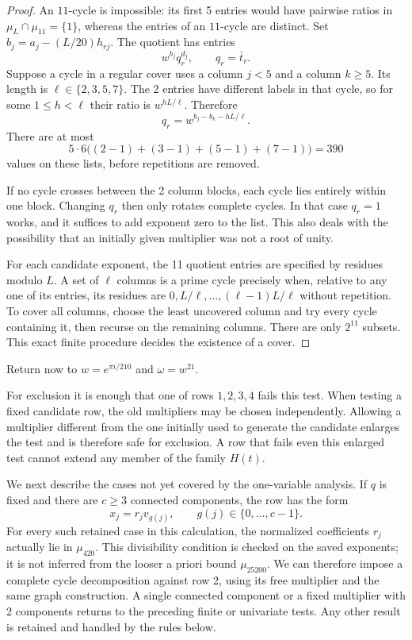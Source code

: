 \documentclass[11pt,a4paper]{article}
\theoremstyle{plain}
\theoremstyle{definition}
\theoremstyle{plain}
\begin{document}
\begin{proof}
An $11$-cycle is impossible: its first 5 entries would have pairwise ratios in $\mu_L\cap\mu_{11}=\{1\}$, whereas the entries of an $11$-cycle are distinct. Set $b_j=a_j-(L/20)h_{rj}$. The quotient has entries
$$w^{b_j}q_r^{d_j},\qquad q_r=\bar t_r.$$
Suppose a cycle in a regular cover uses a column $j<5$ and a column $k\geq5$. Its length is $\ell\in\{2,3,5,7\}$. The 2 entries have different labels in that cycle, so for some $1\leq h<\ell$ their ratio is $w^{hL/\ell}$. Therefore
$$q_r=w^{b_j-b_k-hL/\ell}.$$
There are at most
$$5\cdot6\bigl((2-1)+(3-1)+(5-1)+(7-1)\bigr)=390$$
values on these lists, before repetitions are removed.

If no cycle crosses between the 2 column blocks, each cycle lies entirely within one block. Changing $q_r$ then only rotates complete cycles. In that case $q_r=1$ works, and it suffices to add exponent zero to the list. This also deals with the possibility that an initially given multiplier was not a root of unity.

For each candidate exponent, the 11 quotient entries are specified by residues modulo $L$. A set of $\ell$ columns is a prime cycle precisely when, relative to any one of its entries, its residues are $0,L/\ell,\ldots, (\ell-1)L/\ell$ without repetition. To cover all columns, choose the least uncovered column and try every cycle containing it, then recurse on the remaining columns. There are only $2^{11}$ subsets. This exact finite procedure decides the existence of a cover.
\end{proof}

Return now to $w=e^{\pi i/210}$ and $\omega=w^{21}$.

For exclusion it is enough that one of rows $1,2,3,4$ fails this test. When testing a fixed candidate row, the old multipliers may be chosen independently. Allowing a multiplier different from the one initially used to generate the candidate enlarges the test and is therefore safe for exclusion. A row that fails even this enlarged test cannot extend any member of the family $H(t)$.

\medskip
We next describe the cases not yet covered by the one-variable analysis. If $q$ is fixed and there are $c\geq3$ connected components, the row has the form
$$x_j=r_jv_{g(j)},\qquad g(j)\in\{0,\ldots,c-1\}.$$
For every such retained case in this calculation, the normalized coefficients $r_j$ actually lie in $\mu_{420}$. This divisibility condition is checked on the saved exponents; it is not inferred from the looser a priori bound $\mu_{25200}$. We can therefore impose a complete cycle decomposition against row 2, using its free multiplier and the same graph construction. A single connected component or a fixed multiplier with 2 components returns to the preceding finite or univariate tests. Any other result is retained and handled by the rules below.
\end{document}
